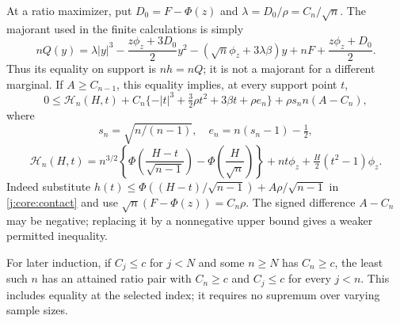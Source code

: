 At a ratio maximizer, put $D_0=F-\Phi(z)$ and $\lambda=D_0/\rho=C_n/\sqrt n$.
The majorant used in the finite calculations is simply
\begin{equation}\label{j:core:scaled-Q}
 nQ(y)=\lambda|y|^3-\frac{z\phi_z+3D_0}{2}y^2
 -(\sqrt n\phi_z+3\lambda\beta)y+nF+\frac{z\phi_z+D_0}{2}.
\end{equation}
Thus its equality on support is $n h=nQ$; it is not a majorant for a
different marginal. If $A\ge C_{n-1}$, this equality implies, at every
support point $t$,
\begin{equation}\label{j:core:predecessor}
 0\le\mathcal H_n(H,t)+C_n\{-|t|^3+\tfrac32\rho t^2+3\beta t+\rho e_n\}
       +\rho s_n n(A-C_n),
\end{equation}
where
\[
 s_n=\sqrt{n/(n-1)},\quad e_n=n(s_n-1)-\tfrac12,
\]
\[
 \mathcal H_n(H,t)=n^{3/2}\!\left\{\Phi\!\left(\frac{H-t}{\sqrt{n-1}}\right)
 -\Phi\!\left(\frac H{\sqrt n}\right)\right\}
 +nt\phi_z+\tfrac H2(t^2-1)\phi_z.
\]
Indeed substitute $h(t)\le\Phi((H-t)/\sqrt{n-1})+A\rho/\sqrt{n-1}$
in \eqref{j:core:contact} and use $\sqrt n(F-\Phi(z))=C_n\rho$.
The signed difference $A-C_n$ may be negative; replacing it by a
nonnegative upper bound gives a weaker permitted inequality.

For later induction, if $C_j\le c$ for $j<N$ and some $n\ge N$ has
$C_n\ge c$, the least such $n$ has an attained ratio pair with
$C_n\ge c$ and $C_j\le c$ for every $j<n$. This includes equality at the
selected index; it requires no supremum over varying sample sizes.

